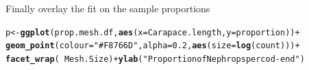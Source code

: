 \documentclass[12pt]{article}\usepackage[]{graphicx}\usepackage[]{color}
\makeatletter
\newcommand{\hlnum}[1]{\textcolor[rgb]{0.686,0.059,0.569}{#1}}%
\newcommand{\hlstr}[1]{\textcolor[rgb]{0.192,0.494,0.8}{#1}}%
\newcommand{\hlopt}[1]{\textcolor[rgb]{0,0,0}{#1}}%
\newcommand{\hlstd}[1]{\textcolor[rgb]{0.345,0.345,0.345}{#1}}%
\newcommand{\hlkwb}[1]{\textcolor[rgb]{0.69,0.353,0.396}{#1}}%
\newcommand{\hlkwc}[1]{\textcolor[rgb]{0.333,0.667,0.333}{#1}}%
\newcommand{\hlkwd}[1]{\textcolor[rgb]{0.737,0.353,0.396}{\textbf{#1}}}%
\newenvironment{kframe}{%
 \def\at@end@of@kframe{}%
 \ifinner\ifhmode%
  \def\at@end@of@kframe{\end{minipage}}%
  \begin{minipage}{\columnwidth}%
 \fi\fi%
 \def\FrameCommand##1{\hskip\@totalleftmargin \hskip-\fboxsep
 \colorbox{shadecolor}{##1}\hskip-\fboxsep
     \hskip-\linewidth \hskip-\@totalleftmargin \hskip\columnwidth}%
 \MakeFramed {\advance\hsize-\width
   \@totalleftmargin\z@ \linewidth\hsize
   \@setminipage}}%
 {\par\unskip\endMakeFramed%
 \at@end@of@kframe}
\newenvironment{knitrout}{}{} %
\makeatother
\begin{document}
Finally overlay the fit on the sample proportions

\begin{knitrout}\footnotesize
{}\color{fgcolor}\begin{kframe}
\begin{alltt}
\hlstd{p} \hlkwb{<-} \hlkwd{ggplot}\hlstd{(prop.mesh.df,} \hlkwd{aes}\hlstd{(}\hlkwc{x} \hlstd{= Carapace.length,} \hlkwc{y} \hlstd{= proportion))} \hlopt{+}
  \hlkwd{geom_point}\hlstd{(}\hlkwc{colour} \hlstd{=} \hlstr{"#F8766D"}\hlstd{,} \hlkwc{alpha} \hlstd{=} \hlnum{0.2}\hlstd{,} \hlkwd{aes}\hlstd{(}\hlkwc{size} \hlstd{=} \hlkwd{log}\hlstd{(count)))} \hlopt{+}
\hlkwd{facet_wrap}\hlstd{(}\hlopt{~} \hlstd{Mesh.Size)} \hlopt{+} \hlkwd{ylab}\hlstd{(}\hlstr{"Proportion of Nephrops per cod-end"}\hlstd{)}


\end{alltt}
\end{kframe}
\end{knitrout}
\end{document}
